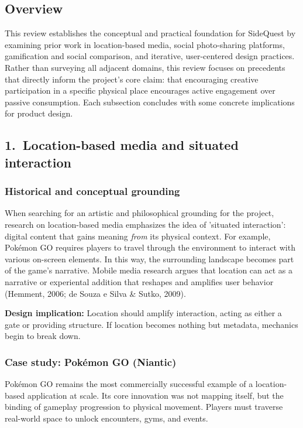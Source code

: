 \documentclass[12pt]{article}
\begin{document}
\subsection*{Overview}
This review establishes the conceptual and practical foundation for SideQuest by examining prior work in location-based media, social photo-sharing platforms, gamification and social comparison, and iterative, user-centered design practices. Rather than surveying all adjacent domains, this review focuses on precedents that directly inform the project's core claim: that encouraging creative participation in a specific physical place encourages active engagement over passive consumption. Each subsection concludes with some concrete implications for product design.

\subsection*{1.\ Location-based media and situated interaction}
\subsubsection*{Historical and conceptual grounding}
When searching for an artistic and philosophical grounding for the project, research on location-based media emphasizes the idea of 'situated interaction': digital content that gains meaning \textit{from} its physical context. For example, Pok\'emon GO requires players to travel through the environment to interact with various on-screen elements. In this way, the surrounding landscape becomes part of the game's narrative. Mobile media research argues that location can act as a narrative or experiental addition that reshapes and amplifies user behavior (Hemment, 2006; de Souza e Silva \& Sutko, 2009).

\textbf{Design implication:} Location should amplify interaction, acting as either a gate or providing structure. If location becomes nothing but metadata, mechanics begin to break down.

\subsubsection*{Case study: Pok\'emon GO (Niantic)}
Pok\'emon GO remains the most commercially successful example of a location-based application at scale. Its core innovation was not mapping itself, but the binding of gameplay progression to physical movement. Players must traverse real-world space to unlock encounters, gyms, and events.
\end{document}
